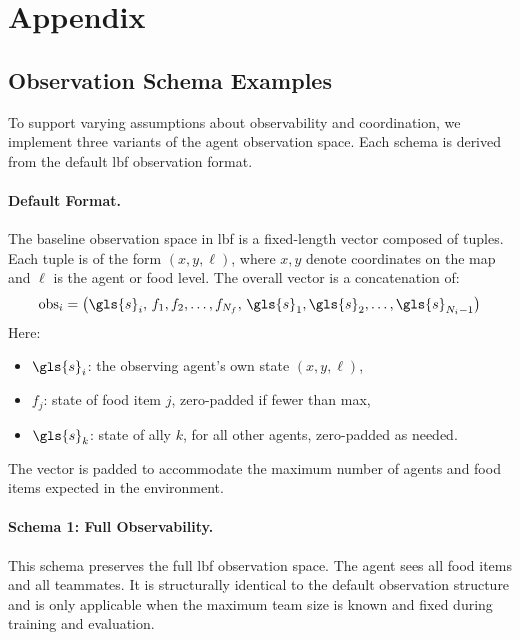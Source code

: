\clearpage
\appendix

\section*{Appendix}
\glsresetall



\subsection*{Observation Schema Examples}
\label{con1:app:obs_spaces}

To support varying assumptions about observability and coordination, 
we implement three variants of the agent observation space. 
Each schema is derived from the default \gls{lbf} observation format.

\paragraph{Default Format.}
The baseline observation space in \gls{lbf} is a fixed-length vector composed of tuples. 
Each tuple is of the form \((x, y, \ell)\), where \(x, y\) denote coordinates on the map 
and \(\ell\) is the agent or food level. The overall vector is a concatenation of:
\[
\text{obs}_i = \left( \gls{s}_i,\, f_1, f_2, 
    \dots, f_{N_f},\, \gls{s}_1, \gls{s}_2, 
    \dots, \gls{s}_{N_i-1} \right)
\]
Here:
\begin{itemize}
    \item \(\gls{s}_i\): the observing agent's own state \((x, y, \ell)\),
    \item \(f_j\): state of food item \(j\), zero-padded if fewer than max,
    \item \(\gls{s}_k\): state of ally \(k\), for all other agents, zero-padded as needed.
\end{itemize}
The vector is padded to accommodate the maximum number of agents and food items expected 
in the environment.

\paragraph{Schema 1: Full Observability.}
This schema preserves the full \gls{lbf} observation space. 
The agent sees all food items and all teammates. 
It is structurally identical to the default observation structure and is only 
applicable when the maximum team size is known and fixed during training and evaluation.

